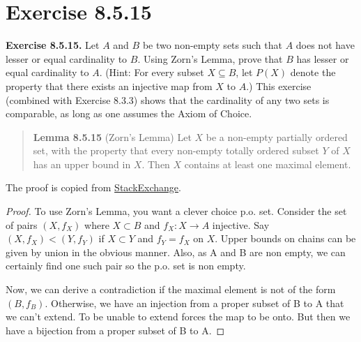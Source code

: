 \documentclass{article}
\begin{document}
\section{Exercise 8.5.15}

\textbf{Exercise 8.5.15.} Let $A$ and $B$ be two non-empty sets such that $A$ does
not have lesser or equal cardinality to $B$. Using Zorn's Lemma, prove that $B$
has lesser or equal cardinality to $A$. (Hint: For every subset $X \subseteq B$, let
$P(X)$ denote the property that there exists an injective map from $X$ to $A$.) This
exercise (combined with Exercise 8.3.3) shows that the cardinality of any two sets
is comparable, as long as one assumes the Axiom of Choice.

\begin{quotation}
    \textbf{Lemma 8.5.15} (Zorn's Lemma) Let $X$ be a non-empty partially ordered
    set, with the property that every non-empty totally ordered subset $Y$ of $X$
    has an upper bound in $X$. Then $X$ contains at least one maximal element.
\end{quotation}

The proof is copied from \href{https://math.stackexchange.com/a/3646288/808819}{StackExchange}.

\begin{proof}
    To use Zorn's Lemma, you want a clever choice p.o. set.
    Consider the set of pairs $(X,f_X)$ where $X\subset B $ and $f_X:X\to A$ injective.
    Say $(X,f_X) < (Y,f_Y)$ if $X\subset Y$ and $f_Y=f_X$ on $X$.
    Upper bounds on chains can be given by union in the obvious manner.
    Also, as A and B are non empty, we can certainly find one such pair so the p.o. set is non empty.

    Now, we can derive a contradiction if the maximal element is not of the form $(B,f_B)$.
    Otherwise, we have an injection from a proper subset of B to A that we can't extend.
    To be unable to extend forces the map to be onto.
    But then we have a bijection from a proper subset of B to A.
\end{proof}
\end{document}
